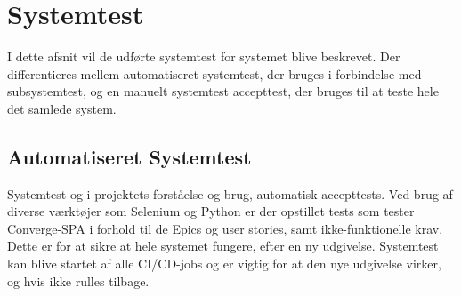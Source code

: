 \section{Systemtest}

I dette afsnit vil de udførte systemtest for systemet blive beskrevet. Der differentieres mellem automatiseret systemtest, der bruges i forbindelse med subsystemtest, og en manuelt systemtest accepttest, der bruges til at teste hele det samlede system.

\subsection{Automatiseret Systemtest}

Systemtest og i projektets forståelse og brug, automatisk-accepttests. Ved brug af diverse værktøjer som Selenium og Python er der opstillet tests som tester Converge-SPA i forhold til de Epics og user stories, samt ikke-funktionelle krav. Dette er for at sikre at hele systemet fungere, efter en ny udgivelse. Systemtest kan blive startet af alle CI/CD-jobs \cite[CI/CD-jobs]{converge-terms} og er vigtig for at den nye udgivelse virker, og hvis ikke rulles tilbage.

